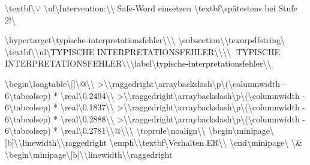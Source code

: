 \textbackslash{}textbf\textbackslash{}{💡 \textbackslash{}ul\textbackslash{}{Intervention:\textbackslash{}}\textbackslash{}} Safe-Word einsetzen \textbackslash{}textbf\textbackslash{}{spätestens bei Stufe 2!\textbackslash{}}

\textbackslash{}hypertarget\textbackslash{}{typische-interpretationsfehler\textbackslash{}}\textbackslash{}{\textbackslash{}%
\textbackslash{}subsection\textbackslash{}{\textbackslash{}texorpdfstring\textbackslash{}{🧠 \textbackslash{}textbf\textbackslash{}{\textbackslash{}ul\textbackslash{}{TYPISCHE INTERPRETATIONSFEHLER\textbackslash{}}\textbackslash{}}\textbackslash{}}\textbackslash{}{🧠 TYPISCHE INTERPRETATIONSFEHLER\textbackslash{}}\textbackslash{}}\textbackslash{}label\textbackslash{}{typische-interpretationsfehler\textbackslash{}}\textbackslash{}}

\textbackslash{}begin\textbackslash{}{longtable\textbackslash{}}[]\textbackslash{}{@\textbackslash{}{\textbackslash{}}
  >\textbackslash{}{\textbackslash{}raggedright\textbackslash{}arraybackslash\textbackslash{}}p\textbackslash{}{(\textbackslash{}columnwidth - 6\textbackslash{}tabcolsep) * \textbackslash{}real\textbackslash{}{0.2494\textbackslash{}}\textbackslash{}}
  >\textbackslash{}{\textbackslash{}raggedright\textbackslash{}arraybackslash\textbackslash{}}p\textbackslash{}{(\textbackslash{}columnwidth - 6\textbackslash{}tabcolsep) * \textbackslash{}real\textbackslash{}{0.1837\textbackslash{}}\textbackslash{}}
  >\textbackslash{}{\textbackslash{}raggedright\textbackslash{}arraybackslash\textbackslash{}}p\textbackslash{}{(\textbackslash{}columnwidth - 6\textbackslash{}tabcolsep) * \textbackslash{}real\textbackslash{}{0.2888\textbackslash{}}\textbackslash{}}
  >\textbackslash{}{\textbackslash{}raggedright\textbackslash{}arraybackslash\textbackslash{}}p\textbackslash{}{(\textbackslash{}columnwidth - 6\textbackslash{}tabcolsep) * \textbackslash{}real\textbackslash{}{0.2781\textbackslash{}}\textbackslash{}}@\textbackslash{}{\textbackslash{}}\textbackslash{}}
\textbackslash{}toprule\textbackslash{}noalign\textbackslash{}{\textbackslash{}}
\textbackslash{}begin\textbackslash{}{minipage\textbackslash{}}[b]\textbackslash{}{\textbackslash{}linewidth\textbackslash{}}\textbackslash{}raggedright
\textbackslash{}emph\textbackslash{}{\textbackslash{}textbf\textbackslash{}{Verhalten ER\textbackslash{}}\textbackslash{}}
\textbackslash{}end\textbackslash{}{minipage\textbackslash{}} \textbackslash{}& \textbackslash{}begin\textbackslash{}{minipage\textbackslash{}}[b]\textbackslash{}{\textbackslash{}linewidth\textbackslash{}}\textbackslash{}raggedright

